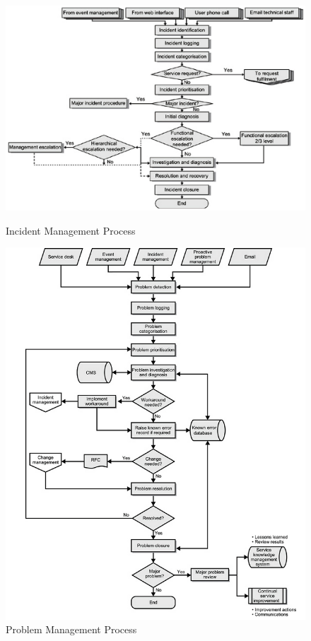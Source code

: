 \begin{figure}
\centering
\scalebox{0.45}
{\includegraphics{ITILIncidentManagement.png}}
\caption[The ITIL Incident Management Process]{Incident Management Process \cite{itilbok}} 
\label{fig:ITILIncidentManagement}
\end{figure}

\begin{figure}[H]
\hspace{-1cm}\includegraphics[scale=0.68]{ITILProblemManagement.png}
\caption[The ITIL Problem Management Process]{Problem Management Process \cite{itilbok}}
\label{fig:ITILProblemManagement}
\end{figure}

